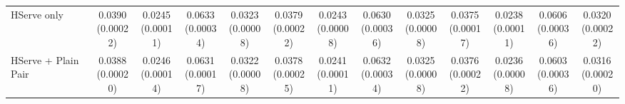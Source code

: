 \begin{table}[t]
\begin{tabular*}{\textwidth}{@{\extracolsep{\fill}} l *{12}{c} @{}}
HServe only & \shortstack[c]{0.0390\\[-1pt]{\tiny(0.00022)}} & \shortstack[c]{0.0245\\[-1pt]{\tiny(0.00011)}} & \shortstack[c]{0.0633\\[-1pt]{\tiny(0.00034)}} & \shortstack[c]{0.0323\\[-1pt]{\tiny(0.00008)}} & \shortstack[c]{0.0379\\[-1pt]{\tiny(0.00022)}} & \shortstack[c]{0.0243\\[-1pt]{\tiny(0.00008)}} & \shortstack[c]{0.0630\\[-1pt]{\tiny(0.00036)}} & \shortstack[c]{0.0325\\[-1pt]{\tiny(0.00008)}} & \shortstack[c]{0.0375\\[-1pt]{\tiny(0.00017)}} & \shortstack[c]{0.0238\\[-1pt]{\tiny(0.00011)}} & \shortstack[c]{0.0606\\[-1pt]{\tiny(0.00036)}} & \shortstack[c]{0.0320\\[-1pt]{\tiny(0.00022)}} \\
\addlinespace[1pt]
HServe + Plain Pair & \shortstack[c]{0.0388\\[-1pt]{\tiny(0.00020)}} & \shortstack[c]{0.0246\\[-1pt]{\tiny(0.00014)}} & \shortstack[c]{0.0631\\[-1pt]{\tiny(0.00017)}} & \shortstack[c]{0.0322\\[-1pt]{\tiny(0.00008)}} & \shortstack[c]{0.0378\\[-1pt]{\tiny(0.00025)}} & \shortstack[c]{0.0241\\[-1pt]{\tiny(0.00011)}} & \shortstack[c]{0.0632\\[-1pt]{\tiny(0.00034)}} & \shortstack[c]{0.0325\\[-1pt]{\tiny(0.00008)}} & \shortstack[c]{0.0376\\[-1pt]{\tiny(0.00022)}} & \shortstack[c]{0.0236\\[-1pt]{\tiny(0.00008)}} & \shortstack[c]{0.0603\\[-1pt]{\tiny(0.00036)}} & \shortstack[c]{0.0316\\[-1pt]{\tiny(0.00020)}} \\

\end{tabular*}
\end{table}
